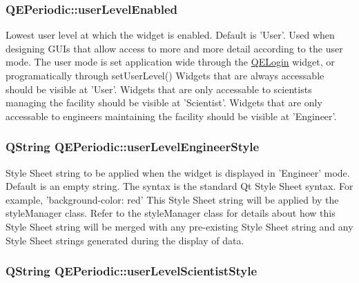 \hypertarget{classQEPeriodic_a0de902aca11667feca3158fa74be789f}{
\subsubsection[{userLevelEnabled}]{ QEPeriodic::userLevelEnabled}}
\label{classQEPeriodic_a0de902aca11667feca3158fa74be789f}
Lowest user level at which the widget is enabled. Default is 'User'. Used when designing GUIs that allow access to more and more detail according to the user mode. The user mode is set application wide through the \hyperlink{classQELogin}{QELogin} widget, or programatically through setUserLevel() Widgets that are always accessable should be visible at 'User'. Widgets that are only accessable to scientists managing the facility should be visible at 'Scientist'. Widgets that are only accessable to engineers maintaining the facility should be visible at 'Engineer'. \hypertarget{classQEPeriodic_a5d5e9b1229dc86c1ddaa10a5147737f7}{
\subsubsection[{userLevelEngineerStyle}]{\setlength{\rightskip}{0pt plus 5cm}QString QEPeriodic::userLevelEngineerStyle}}
\label{classQEPeriodic_a5d5e9b1229dc86c1ddaa10a5147737f7}
Style Sheet string to be applied when the widget is displayed in 'Engineer' mode. Default is an empty string. The syntax is the standard Qt Style Sheet syntax. For example, 'background-\/color: red' This Style Sheet string will be applied by the styleManager class. Refer to the styleManager class for details about how this Style Sheet string will be merged with any pre-\/existing Style Sheet string and any Style Sheet strings generated during the display of data. \hypertarget{classQEPeriodic_a91a128c6ede1d9d392d1ab68e2499f77}{
\subsubsection[{userLevelScientistStyle}]{\setlength{\rightskip}{0pt plus 5cm}QString QEPeriodic::userLevelScientistStyle}}

